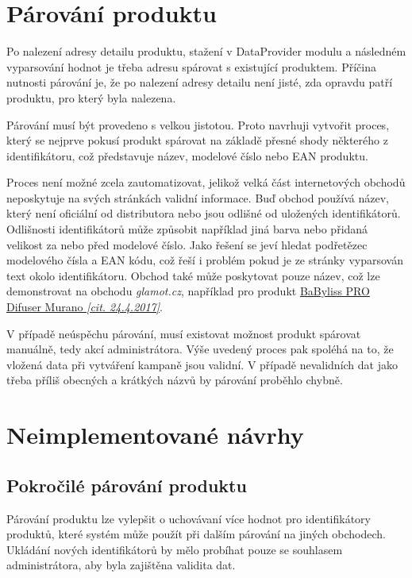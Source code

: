 \documentclass[thesis=B,czech]{FITthesis}[2012/06/26]
\begin{document}
\section{Párování produktu}
Po nalezení adresy detailu produktu, stažení v DataProvider modulu a následném vyparsování hodnot je třeba adresu spárovat s 
existující produktem. Příčina nutnosti párování je, že po nalezení adresy detailu není jisté, zda opravdu patří produktu, pro který 
byla nalezena. 
\par
Párování musí být provedeno s velkou jistotou. Proto navrhuji vytvořit proces, který se nejprve pokusí produkt spárovat na základě
přesné shody některého z identifikátoru, což představuje název, modelové číslo nebo EAN produktu. 
\par
Proces není možné zcela zautomatizovat, jelikož velká část internetových obchodů neposkytuje na svých stránkách validní informace.\cite{hunka}
Buď obchod používá název, který není oficiální od distributora nebo jsou odlišné od uložených identifikátorů. Odlišnosti identifikátorů může způsobit například jiná barva nebo přidaná velikost za nebo před modelové
číslo. Jako řešení se jeví hledat podřetězec modelového čísla a EAN kódu, což řeší i problém pokud je ze stránky vyparsován text okolo
identifikátoru. Obchod také může poskytovat pouze název, což lze demonstrovat na obchodu \textit{glamot.cz}, například
pro produkt 
\href{https://www.glamot.cz/p/19128/difuzer-k-vysouseci-babyliss-pro-difuser-murano}{BaByliss PRO Difuser Murano \textit{[cit. 24.4.2017]}}.
\par
V případě neúspěchu párování, musí existovat možnost produkt spárovat manuálně, tedy akcí administrátora. 
Výše uvedený proces pak spoléhá na to, že vložená data při vytváření kampaně jsou validní. V případě nevalidních dat jako třeba
příliš obecných a krátkých názvů by párování proběhlo chybně.


\section{Neimplementované návrhy}
\subsection{Pokročilé párování produktu}
Párování produktu lze vylepšit o uchovávaní více hodnot pro identifikátory produktů, které systém může použít při dalším 
párování na jiných obchodech. Ukládání nových identifikátorů by mělo probíhat pouze se souhlasem administrátora, aby byla zajištěna validita dat.
\end{document}
